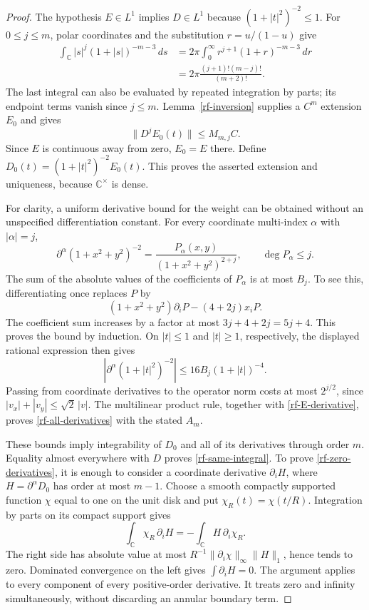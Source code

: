 \begin{proof}
The hypothesis $E\in L^1$ implies $D\in L^1$ because
$(1+|t|^2)^{-2}\leq1$.  For $0\leq j\leq m$, polar coordinates
and the substitution $r=u/(1-u)$ give
\begin{align*}
 \int_{\mathbb C}|s|^j(1+|s|)^{-m-3}\,ds
 &=2\pi\int_0^\infty r^{j+1}(1+r)^{-m-3}\,dr\\
 &=2\pi\frac{(j+1)!(m-j)!}{(m+2)!}.
\end{align*}
The last integral can also be evaluated by repeated integration
by parts; its endpoint terms vanish since $j\leq m$.
Lemma~\ref{rf-inversion} supplies a $C^m$ extension $E_0$ and gives
\begin{equation}\label{rf-E-derivative}
                       \|D^jE_0(t)\|\leq M_{m,j}C.
\end{equation}
Since $E$ is continuous away from zero, $E_0=E$ there.
Define $D_0(t)=(1+|t|^2)^{-2}E_0(t)$.  This proves the asserted
extension and uniqueness, because $\mathbb C^\times$ is dense.

For clarity, a uniform derivative bound for the weight can
be obtained without an unspecified differentiation constant.
For every coordinate multi-index $\alpha$ with $|\alpha|=j$,
\[
 \partial^\alpha(1+x^2+y^2)^{-2}
     =\frac{P_\alpha(x,y)}{(1+x^2+y^2)^{2+j}},
 \qquad \deg P_\alpha\leq j.
\]
The sum of the absolute values of the coefficients of
$P_\alpha$ is at most $B_j$.  To see this, differentiating once
replaces $P$ by
\[
  (1+x^2+y^2)\partial_iP-(4+2j)x_iP.
\]
The coefficient sum increases by a factor at most
$3j+4+2j=5j+4$.  This proves the bound by induction.
On $|t|\leq1$ and $|t|\geq1$, respectively, the displayed
rational expression then gives
\[
 |\partial^\alpha(1+|t|^2)^{-2}|
                      \leq16B_j(1+|t|)^{-4}.
\]
Passing from coordinate derivatives to the operator norm
costs at most $2^{j/2}$, since
$|v_x|+|v_y|\leq\sqrt2\,|v|$.
The multilinear product rule, together with
\eqref{rf-E-derivative}, proves \eqref{rf-all-derivatives}
with the stated $A_m$.

These bounds imply integrability of $D_0$ and all of its
derivatives through order $m$.  Equality almost everywhere
with $D$ proves \eqref{rf-same-integral}.
To prove \eqref{rf-zero-derivatives}, it is enough to consider
a coordinate derivative $\partial_i H$, where
$H=\partial^\alpha D_0$ has order at most $m-1$.
Choose a smooth compactly supported function $\chi$ equal to
one on the unit disk and put $\chi_R(t)=\chi(t/R)$.
Integration by parts on its compact support gives
\[
 \int_{\mathbb C}\chi_R\,\partial_i H
        =-\int_{\mathbb C}H\,\partial_i\chi_R.
\]
The right side has absolute value at most
$R^{-1}\|\partial_i\chi\|_\infty\|H\|_1$, hence tends to zero.
Dominated convergence on the left gives
$\int\partial_iH=0$.  The argument applies to every component
of every positive-order derivative.  It treats zero and
infinity simultaneously, without discarding an annular
boundary term.
\end{proof}

